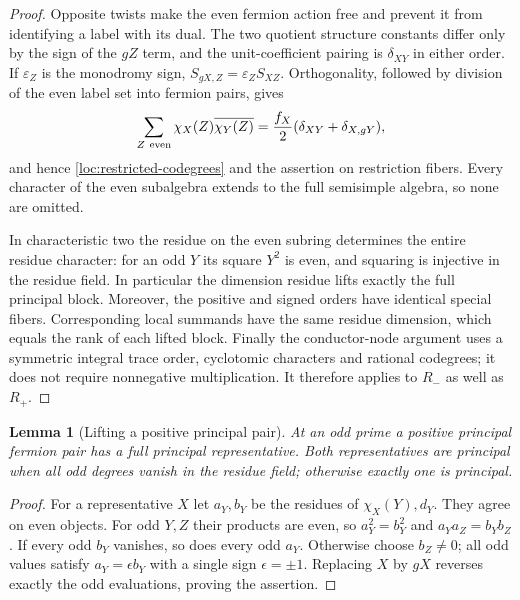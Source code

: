 \documentclass[11pt,a4paper]{article}
\numberwithin{equation}{section}
\newtheorem{lemma}[theorem]{Lemma}
\begin{document}
\begin{proof}
Opposite twists make the even fermion action free and prevent it
from identifying a label with its dual. The two quotient structure
constants differ only by the sign of the $gZ$ term, and the
unit-coefficient pairing is $\delta_{XY}$ in either order.
If $\varepsilon_Z$ is the monodromy sign,
$S_{gX,Z}=\varepsilon_ZS_{XZ}$. Orthogonality, followed by division
of the even label set into fermion pairs, gives
\[
 \sum_{Z\ {\rm even}}\chi_X(Z)\overline{\chi_Y(Z)}
       =\frac{f_X}{2}(\delta_{XY}+\delta_{X,gY}),
\]
and hence \eqref{loc:restricted-codegrees} and the assertion on
restriction fibers. Every character of the even subalgebra extends
to the full semisimple algebra, so none are omitted.

In characteristic two the residue on the even subring determines
the entire residue character: for an odd $Y$ its square $Y^2$ is even,
and squaring is injective in the residue field. In particular the
dimension residue lifts exactly the full principal block. Moreover,
the positive and signed orders have identical special fibers.
Corresponding local summands have the same residue dimension,
which equals the rank of each lifted block. Finally the conductor-node argument uses a symmetric
integral trace order, cyclotomic characters and rational codegrees;
it does not require nonnegative multiplication. It therefore
applies to $R_-$ as well as $R_+$.
\end{proof}

\begin{lemma}[Lifting a positive principal pair]\label{loc:principal-lift}
At an odd prime a positive principal fermion pair has a full
principal representative. Both representatives are principal when
all odd degrees vanish in the residue field; otherwise exactly
one is principal.
\end{lemma}
\begin{proof}
For a representative $X$ let $a_Y,b_Y$ be the residues of
$\chi_X(Y),d_Y$. They agree on even objects.
For odd $Y,Z$ their products are even, so
$a_Y^2=b_Y^2$ and $a_Ya_Z=b_Yb_Z$. If every odd $b_Y$ vanishes,
so does every odd $a_Y$. Otherwise choose $b_Z\ne0$; all odd
values satisfy $a_Y=\epsilon b_Y$ with a single sign
$\epsilon=\pm1$. Replacing $X$ by $gX$ reverses exactly the odd
evaluations, proving the assertion.
\end{proof}
\end{document}
